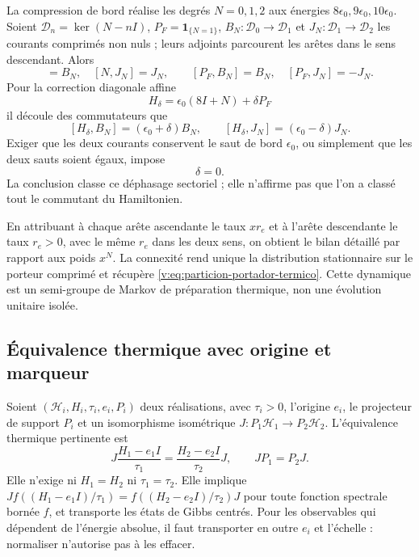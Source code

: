 La compression de bord réalise les degrés $N=0,1,2$ aux énergies
$8\epsilon_0,9\epsilon_0,10\epsilon_0$. Soient
$\mathcal D_n=\ker(N-nI)$,
$P_F=\mathbf1_{\{N=1\}}$,
$B_N:\mathcal D_0\to\mathcal D_1$ et
$J_N:\mathcal D_1\to\mathcal D_2$ les courants comprimés non nuls ;
leurs adjoints parcourent les arêtes dans le sens descendant. Alors
\begin{equation}
 [N,B_N]=B_N,\quad [N,J_N]=J_N,\qquad
 [P_F,B_N]=B_N,\quad [P_F,J_N]=-J_N.
 \label{v:eq:conmutadores-corrientes-termicas}
\end{equation}
Pour la correction diagonale affine
\[
 H_\delta=\epsilon_0(8I+N)+\delta P_F
\]
il découle des commutateurs que
\[
 [H_\delta,B_N]=(\epsilon_0+\delta)B_N,
 \qquad
 [H_\delta,J_N]=(\epsilon_0-\delta)J_N.
\]
Exiger que les deux courants conservent le saut de bord $\epsilon_0$, ou
simplement que les deux sauts soient égaux, impose
\begin{equation}
 \delta=0.
 \label{v:eq:rigidez-desfase-corrientes}
\end{equation}
La conclusion classe ce déphasage sectoriel ; elle n’affirme pas que l’on a
classé tout le commutant du Hamiltonien.

En attribuant à chaque arête ascendante le taux $xr_e$ et à l’arête descendante le taux
$r_e>0$, avec le même $r_e$ dans les deux sens, on obtient le bilan détaillé
par rapport aux poids $x^N$. La connexité rend unique la distribution
stationnaire sur le porteur comprimé et récupère
\eqref{v:eq:particion-portador-termico}. Cette dynamique est un semi-groupe de
Markov de préparation thermique, non une évolution unitaire isolée.

\subsection{Équivalence thermique avec origine et marqueur}

Soient $(\mathscr H_i,H_i,\tau_i,e_i,P_i)$ deux réalisations, avec
$\tau_i>0$, l’origine $e_i$, le projecteur de support $P_i$ et un isomorphisme
isométrique $J:P_1\mathscr H_1\to P_2\mathscr H_2$. L’équivalence thermique
pertinente est
\begin{equation}
 J\frac{H_1-e_1I}{\tau_1}
 =\frac{H_2-e_2I}{\tau_2}J,\qquad
 JP_1=P_2J.
 \label{v:eq:equivalencia-termica-centrada}
\end{equation}
Elle n’exige ni $H_1=H_2$ ni $\tau_1=\tau_2$. Elle implique
$Jf((H_1-e_1I)/\tau_1)=f((H_2-e_2I)/\tau_2)J$ pour toute fonction spectrale
bornée $f$, et transporte les états de Gibbs centrés. Pour les observables
qui dépendent de l’énergie absolue, il faut transporter en outre $e_i$ et
l’échelle : normaliser n’autorise pas à les effacer.

